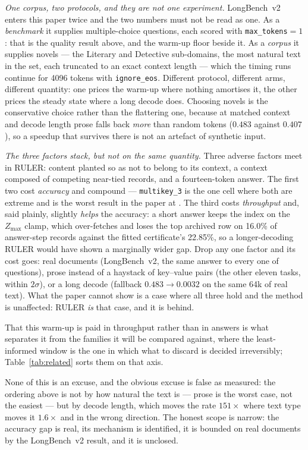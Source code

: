 \emph{One corpus, two protocols, and they are not one experiment.} LongBench~v2
enters this paper twice and the two numbers must not be read as one. As a
\emph{benchmark} it supplies \lbKDN{} multiple-choice questions, each scored
with \texttt{max\_tokens}${=}1$: that is the quality result above, and the
warm-up floor beside it. As a \emph{corpus} it supplies novels --- the Literary
and Detective sub-domains, the most natural text in the set, each truncated to
an exact context length --- which the timing runs continue for 4096 tokens with
\texttt{ignore\_eos}. Different protocol, different arms, different quantity:
one prices the warm-up where nothing amortises it, the other prices the steady
state where a long decode does. Choosing novels is the conservative choice
rather than the flattering one, because at matched context and decode length
prose falls back \emph{more} than random tokens ($0.483$ against $0.407$), so a
speedup that survives there is not an artefact of synthetic input.

\emph{The three factors stack, but not on the same quantity.} Three adverse
factors meet in RULER: content planted so as not to belong to its context, a
context composed of competing near-tied records, and a fourteen-token answer.
The first two cost \emph{accuracy} and compound --- \texttt{multikey\_3} is the
one cell where both are extreme and is the worst result in the paper at
. The third costs \emph{throughput} and, said plainly,
slightly \emph{helps} the accuracy: a short answer keeps the index on the
$Z_{\max}$ clamp, which over-fetches and loses the top archived row on 16.0\%
of answer-step records against the fitted certificate's 22.85\%, so a
longer-decoding RULER would have shown a marginally wider gap. Drop any one
factor and its cost goes: real documents (LongBench~v2, the same answer to
every one of \lbKDN{} questions), prose instead of a haystack of key--value
pairs (the other eleven tasks, within $2\sigma$), or a long decode (fallback
$0.483\to0.0032$ on the same 64k of real text). What the paper cannot show is a
case where all three hold and the method is unaffected: RULER \emph{is} that
case, and it is  behind.

That this warm-up is paid in throughput rather than in answers is what
separates it from the families it will be compared against, where the
least-informed window is the one in which what to discard is decided
irreversibly; Table~\ref{tab:related} sorts them on that axis.

None of this is an excuse, and the obvious excuse is false as measured: the
ordering above is not by how natural the text is --- prose is the worst case,
not the easiest --- but by decode length, which moves the rate $151\times$ where
text type moves it $1.6\times$ and in the wrong direction. The honest scope is
narrow: the accuracy gap is real, its mechanism is identified, it is bounded on
real documents by the LongBench~v2 result, and it is unclosed.

